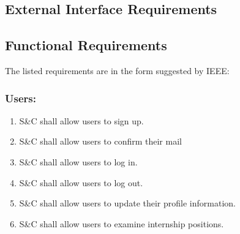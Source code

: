 

\subsection{External Interface Requirements}

\subsection{Functional Requirements}
    The listed requirements are in the form suggested by IEEE: 
    \newline
    \subsubsection*{Users:}
        \begin{enumerate}[label=\textbf{R\arabic*}]
            \item S\&C shall allow users to sign up.                    %
            \item S\&C shall allow users to confirm their mail          %
            \item S\&C shall allow users to log in.                     %
            \item S\&C shall allow users to log out.                    %
            \item S\&C shall allow users to update their profile information.       %
            \item S\&C shall allow users to examine internship positions.           
        \end{enumerate}
        
